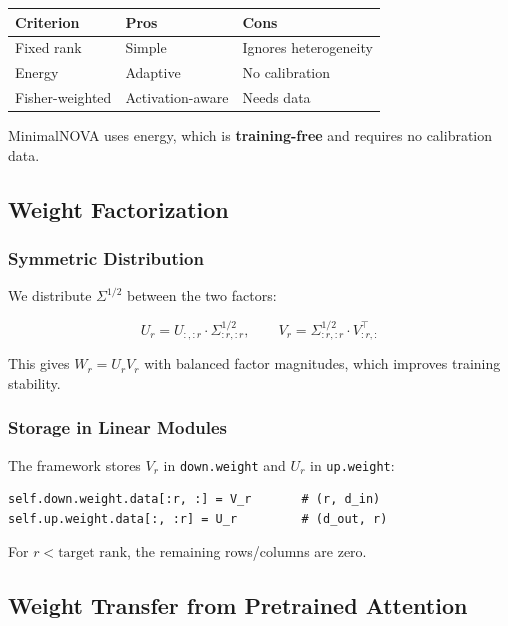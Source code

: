 \begin{table}[H]
\centering
\small
\begin{tabular}{lll}
\toprule
\textbf{Criterion} & \textbf{Pros} & \textbf{Cons} \\
\midrule
Fixed rank & Simple & Ignores heterogeneity \\
Energy & Adaptive & No calibration \\
Fisher-weighted & Activation-aware & Needs data \\
\bottomrule
\end{tabular}
\end{table}

MinimalNOVA uses energy, which is \textbf{training-free} and requires no 
calibration data.

\subsection{Weight Factorization}

\subsubsection{Symmetric Distribution}

We distribute $\Sigma^{1/2}$ between the two factors:

\[
U_r = U_{:, :r} \cdot \Sigma_{:r, :r}^{1/2}, \qquad
V_r = \Sigma_{:r, :r}^{1/2} \cdot V_{:r, :}^\top
\tag{4.5}
\]

This gives $W_r = U_r V_r$ with balanced factor magnitudes, which improves 
training stability.

\subsubsection{Storage in Linear Modules}

The framework stores $V_r$ in \texttt{down.weight} and $U_r$ in \texttt{up.weight}:

\begin{lstlisting}
self.down.weight.data[:r, :] = V_r       # (r, d_in)
self.up.weight.data[:, :r] = U_r         # (d_out, r)
\end{lstlisting}

For $r < \text{target rank}$, the remaining rows/columns are zero.

\subsection{Weight Transfer from Pretrained Attention}

